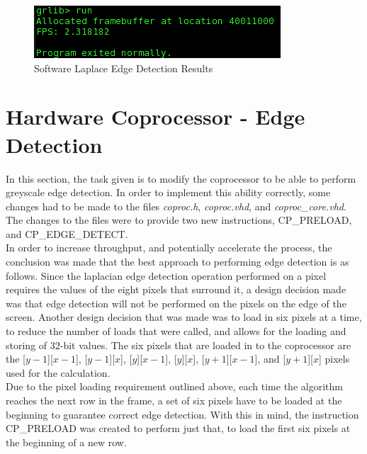 \documentclass{article}
\begin{document}
	 \begin{figure}[H]
	 	\begin{center}
	 		\includegraphics[scale=0.6]{../part6_files/Software_Laplace_edge_software_performance.png}
	 		\caption{Software Laplace Edge Detection Results}
	 	\end{center}
	 \end{figure}


\section{Hardware Coprocessor - Edge Detection}
In this section, the task given is to modify the coprocessor to be able to perform greyscale edge detection. In order to implement this ability correctly, some changes had to be made to the files \textit{coproc.h}, \textit{coproc.vhd}, and \textit{coproc\_core.vhd}. The changes to the files were to provide two new instructions, CP\_PRELOAD, and CP\_EDGE\_DETECT.\\
In order to increase throughput, and potentially accelerate the process, the conclusion was made that the best approach to performing edge detection is as follows. Since the laplacian edge detection operation performed on a pixel requires the values of the eight pixels that surround it, a design decision made was that edge detection will not be performed on the pixels on the edge of the screen. Another design decision that was made was to load in six pixels at a time, to reduce the number of loads that were called, and allows for the loading and storing of 32-bit values. The six pixels that are loaded in to the coprocessor are the [$y - 1$][$x - 1$], [$y - 1$][$x$], [$y$][$x - 1$], [$y$][$x$], [$y + 1$][$x - 1$], and [$y + 1$][$x$] pixels used for the calculation. \\

Due to the pixel loading requirement outlined above, each time the algorithm reaches the next row in the frame, a set of six pixels have to be loaded at the beginning to guarantee correct edge detection. With this in mind, the instruction CP\_PRELOAD was created to perform just that, to load the first six pixels at the beginning of a new row. \\
\end{document}
